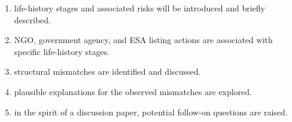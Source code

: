 \begin{enumerate}[label=\arabic*.]
\begin{enumerate}[label=\arabic{enumi}\alph*., leftmargin=*]
        \item life-history stages and associated risks will be introduced and briefly described.
        \item NGO, government agency, and ESA listing actions are associated with specific life-history stages.
        \item structural mismatches are identified and discussed.
        \item plausible explanations for the observed mismatches are explored.
        \item in the spirit of a discussion paper, potential follow-on questions are raised.
    \end{enumerate}
\end{enumerate}
